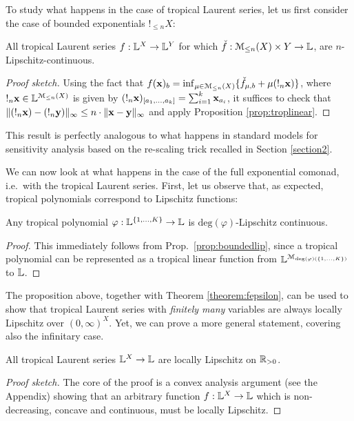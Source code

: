To study what happens in the case of tropical Laurent series, let us first consider the case of bounded exponentials $!_{\leq n}X$:
\begin{proposition}\label{prop:boundedlip}
All tropical Laurent series $f: \mathbb{L}^{X}\to \mathbb{L}^{Y}$ for which $\check f:{\mathcal{M}_{\leq n}(X)}\times Y\to \mathbb{L}$, are $n$-Lipschitz-continuous.
\end{proposition}
\begin{proof}[Proof sketch]
Using the fact that $f(\mathbf{x})_{b}=\inf_{\mu\in \mathcal{M}_{\leq n}(X)}\{ \check f_{\mu,b}+ \mu (!_{n}\mathbf{x}) \}$, where $!_{n}\mathbf{x}\in \mathbb{L}^{\mathcal{M}_{\leq n}(X)}$ is given by 
$(!_{n}\mathbf{x})_{[a_{1},\dots, a_{k}]}=\sum_{i=1}^{k}\mathbf{x}_{a_{i}}$, 
it suffices to check that $\| (!_{n}\mathbf{x})-(!_{n}\mathbf{y})\|_{\infty}\leq n\cdot \| \mathbf{x}-\mathbf{y}\|_{\infty}$ and apply Proposition \ref{prop:troplinear}.
\end{proof}
This result is perfectly analogous to what happens in standard models for sensitivity analysis based on the re-scaling trick recalled in Section \ref{section2}.

We can now look at what happens in the case of the full exponential comonad, i.e.~with the tropical Laurent series.
First, let us observe that, as expected, tropical polynomials 
correspond to Lipschitz functions:
\begin{proposition}
Any tropical polynomial $\varphi:\mathbb{L}^{\{1,\dots, K\}}\to\mathbb{L}$ is $\mathrm{deg}(\varphi)$-Lipschitz continuous.
\end{proposition}
\begin{proof}
This immediately follows from Prop.~\ref{prop:boundedlip}, since a tropical polynomial can be represented as a tropical linear function from $\mathbb{L}^{\mathcal{M}_{\mathrm{deg}(\varphi)(\{1,\dots, K\})}}$ to $\mathbb{L}$.
\end{proof}

The proposition above, together with Theorem \ref{theorem:fepsilon}, can be used to show that tropical Laurent series with \emph{finitely many} variables are always locally Lipschitz over $(0,\infty)^{X}$. Yet, we can prove a more general statement, covering also the infinitary case.


\begin{theorem}\label{thmTLSlocLip}
 All tropical Laurent series $\mathbb{L}^X\to\mathbb{L}$ are locally Lipschitz on $\mathbb{R}_{>0}$.
\end{theorem}
\begin{proof}[Proof sketch]
The core of the proof is a convex analysis argument (see the Appendix) showing that an arbitrary function $f:\mathbb{L}^X\to\mathbb{L}$ which is non-decreasing, concave and continuous, must be locally Lipschitz. 
\end{proof}



